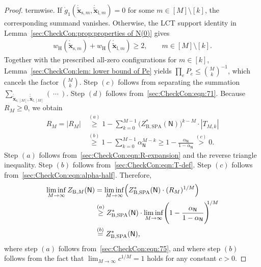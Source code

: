 \documentclass[journal]{IEEEtran}
\newcommand{\vect}[1]{ \bm{#1} }
\newcommand{\wh}{w_{\mathrm{H}}}
\newcommand{\graphN}{ \mathsf{N} }
\newcommand{\ZBSPA}{ Z_{\mathrm{B,SPA}} }
\newcommand{\ZBM}{ Z_{\mathrm{B},M} }
\newcommand{\LCTtv}[1]{ \mathring{ \tilde{ \vect{#1} } } }
\newcommand{\LCT}[1]{ \mathring{#1} }
\newcommand{\LCTvxlm}{ \LCTtv{x}_{\mathrm{l},m} }
\newcommand{\LCTvxsm}{ \LCTtv{x}_{\mathrm{s},m} }
\newcommand{\LCTvxlM}{ \LCTtv{x}_{\mathrm{l},[M]} }
\newcommand{\LCTvxsM}{ \LCTtv{x}_{\mathrm{s},[M]} }
\newcommand{\gone}{\LCT{g}_{1}}
\begin{document}
\begin{appendices}
\begin{proof}
{      termwise. If $\gone(\LCTvxsm,\LCTvxlm)=0$ for some
      $m\in[M]\setminus[k]$, the corresponding summand vanishes. Otherwise,
      the LCT support identity in
      Lemma~\ref{sec:CheckCon:prop:properties of N(0)} gives
      \begin{align*}
        \wh(\LCTvxsm)+\wh(\LCTvxlm)\geq2,
        \qquad m\in[M]\setminus[k].
      \end{align*}%
      Together with the prescribed all-zero configurations for $m\in[k]$,
      Lemma~\ref{sec:CheckCon:lem: lower bound of Pe} yields
      $\prod_eP_e\leq\binom{M}{k}^{-1}$, which cancels the factor
      $\binom{M}{k}$. Step $(c)$ follows from separating
      the summation $ \sum_{ \LCTvxsM, \LCTvxlM }(\ \cdots\ ) $. Step $(d)$
      follows from~\eqref{sec:CheckCon:eqn:71}. Because $R_M \geq 0$, we
      obtain
      \begin{align}
        R_M
        = |R_M|
         & \overset{(a)}{\geq}
        1
        -
        \sum_{k=0}^{M-1} \bigl( \ZBSPA^{*}( \graphN) \bigr)^{\! k-M} \cdot |T_{M,k}| \nonumber \\
         & \overset{(b)}{\geq}
        1-\sum_{k=0}^{M-1}\alpha_{\graphN}^{M-k}
        \geq 1-\frac{\alpha_{\graphN}}{1-\alpha_{\graphN}}
        \overset{(c)}{>}0.
        \label{sec:CheckCon:eqn:75}
      \end{align}%
      Step $(a)$ follows from~\eqref{sec:CheckCon:eqn:R-expansion} and the
      reverse triangle inequality. Step $(b)$ follows
      from~\eqref{sec:CheckCon:eqn:T-def}. Step $(c)$ follows
      from~\eqref{sec:CheckCon:eqn:alpha-half}. Therefore,}%
    \begin{align*}
      \liminf_{M \to \infty}
      \ZBM(\graphN)
       & =
      \liminf_{M \to \infty}
      \Bigl( \ZBSPA^{*}(\graphN)
      \cdot (R_M)^{1/M} \Bigr)
      \\  & \overset{(a)}{\geq}
      \ZBSPA^{*}(\graphN)
      \cdot
      \liminf_{M \to \infty}
      \Biggl(
      1 -
      \frac{ \alpha_{\graphN}
      }{ 1-\alpha_{\graphN} }
      \Biggr)^{\! \!\! 1/M}
      \nonumber                                \\
       & \overset{(b)}{=} \ZBSPA^{*}(\graphN),
    \end{align*}
    where step $(a)$ follows from~\eqref{sec:CheckCon:eqn:75}, and where step
    $(b)$ follows from the fact that $\lim_{M\to\infty}c^{1/M} = 1$ holds for
    any constant $c>0$.
  \end{proof}


\end{appendices}
\end{document}

